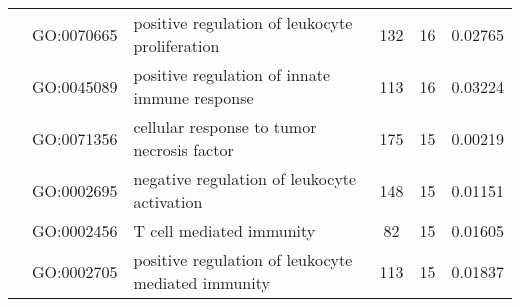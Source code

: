 \documentclass[../main.tex]{subfiles}
\begin{document}
\begin{landscape}
\begin{longtable}{@{}lllccr@{}}
		                                               & GO:0070665                         & positive regulation of leukocyte proliferation                            & 132                                                                & 16                                                                   & 0.02765                                                                                  \\
		                                               & GO:0045089                         & positive regulation of innate immune response                             & 113                                                                & 16                                                                   & 0.03224                                                                                  \\
		                                               & GO:0071356                         & cellular response to tumor necrosis factor                                & 175                                                                & 15                                                                   & 0.00219                                                                                  \\
		                                               & GO:0002695                         & negative regulation of leukocyte activation                               & 148                                                                & 15                                                                   & 0.01151                                                                                  \\
		                                               & GO:0002456                         & T cell mediated immunity                                                  & 82                                                                 & 15                                                                   & 0.01605                                                                                  \\
		                                               & GO:0002705                         & positive regulation of leukocyte mediated immunity                        & 113                                                                & 15                                                                   & 0.01837                                                                                  \\

\end{longtable}
\end{landscape}
\end{document}
